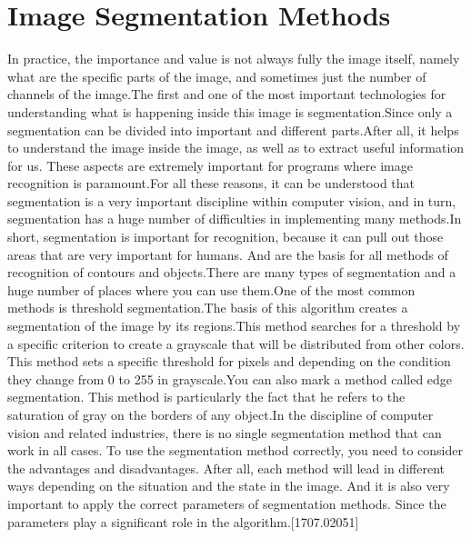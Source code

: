 \section{Image Segmentation Methods}\label{sec:3.4}
\par In practice, the importance and value is not always fully the image itself, namely what are the specific parts of the image, and sometimes just the number of channels of the image.The first and one of the most important technologies for understanding what is happening inside this image is segmentation.Since only a segmentation can be divided into important and different parts.After all, it helps to understand the image inside the image, as well as to extract useful information for us.  These aspects are extremely important for programs where image recognition is paramount.For all these reasons, it can be understood that segmentation is a very important discipline within computer vision, and in turn, segmentation has a huge number of difficulties in implementing many methods.In short, segmentation is important for recognition, because it can pull out those areas that are very important for humans. And are the basis for all methods of recognition of contours and objects.There are many types of segmentation and a huge number of places where you can use them.One of the most common methods is threshold segmentation.The basis of this algorithm creates a segmentation of the image by its regions.This method searches for a threshold by a specific criterion to create a grayscale that will be distributed from other colors. This method sets a specific threshold for pixels and depending on the condition they change from 0 to 255 in grayscale.You can also mark a method called edge segmentation. This method is particularly the fact that he refers to the saturation of gray on the borders of any object.In the discipline of computer vision and related industries, there is no single segmentation method that can work in all cases. To use the segmentation method correctly, you need to consider the advantages and disadvantages. After all, each method will lead in different ways depending on the situation and the state in the image. And it is also very important to apply the correct parameters of segmentation methods. Since the parameters play a significant role in the algorithm.[1707.02051]

